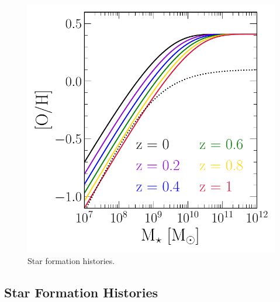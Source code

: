 \documentclass[ms.tex]{subfiles}
\begin{document}
\begin{figure}
\includegraphics[scale = 0.42]{mzr.pdf}
\caption{Star formation histories.}
\label{fig:sfhs}
\end{figure}

\subsection{Star Formation Histories}
\label{sec:galprops:sfhs}
\end{document}
